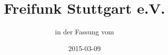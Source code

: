 
\subject{Satzung}
\title{Freifunk Stuttgart e.V.\\}
\author{in der Fassung vom}
\date{2015-03-09}
\maketitle



